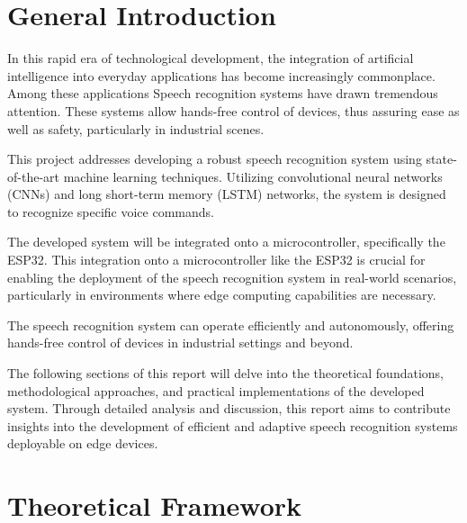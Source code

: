 \documentclass[a4paper]{report}
\let\listofalgorithms\listoffigures
\begin{document}
\clearpage
\tableofcontents
\newpage
\listoffigures
\newpage
\listofalgorithms

\chapter*{General Introduction}
In this rapid era of technological development, the integration of artificial intelligence
into everyday applications has become increasingly commonplace. Among these applications
Speech recognition systems have drawn tremendous attention. These systems allow hands-free control of
devices, thus assuring ease as well as safety, particularly in industrial scenes.

This project addresses developing a robust speech recognition system using state-of-the-art machine learning techniques. Utilizing convolutional neural networks (CNNs) and long short-term memory (LSTM) networks, the system is designed to recognize specific voice commands. 

The developed system will be integrated onto a microcontroller, specifically the ESP32. This integration onto a microcontroller like the ESP32 is crucial for enabling the deployment of the speech recognition system in real-world scenarios, particularly in environments where edge computing capabilities are necessary.

The speech recognition system can operate efficiently and autonomously, offering hands-free control of devices in industrial settings and beyond.

The following sections of this report will delve into the theoretical foundations, methodological approaches, and practical implementations of the developed system. Through detailed analysis and discussion, this report aims to contribute insights into the development of efficient and adaptive speech recognition systems deployable on edge devices.
\vspace*{-3cm}
\chapter{Theoretical Framework}
\end{document}
